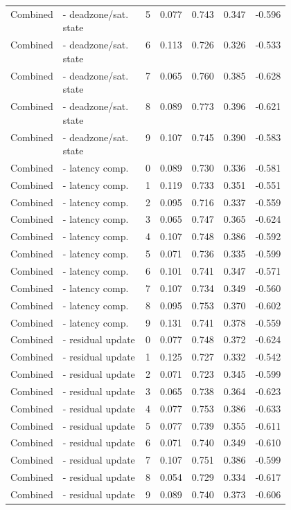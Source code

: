 \documentclass{article}
\begin{document}
\begin{center}
\begin{longtable}{p{0.13\linewidth}p{0.34\linewidth}rrrrr}
Combined & - deadzone/sat. state & 5 & 0.077 & 0.743 & 0.347 & -0.596\\
Combined & - deadzone/sat. state & 6 & 0.113 & 0.726 & 0.326 & -0.533\\
Combined & - deadzone/sat. state & 7 & 0.065 & 0.760 & 0.385 & -0.628\\
Combined & - deadzone/sat. state & 8 & 0.089 & 0.773 & 0.396 & -0.621\\
Combined & - deadzone/sat. state & 9 & 0.107 & 0.745 & 0.390 & -0.583\\
Combined & - latency comp. & 0 & 0.089 & 0.730 & 0.336 & -0.581\\
Combined & - latency comp. & 1 & 0.119 & 0.733 & 0.351 & -0.551\\
Combined & - latency comp. & 2 & 0.095 & 0.716 & 0.337 & -0.559\\
Combined & - latency comp. & 3 & 0.065 & 0.747 & 0.365 & -0.624\\
Combined & - latency comp. & 4 & 0.107 & 0.748 & 0.386 & -0.592\\
Combined & - latency comp. & 5 & 0.071 & 0.736 & 0.335 & -0.599\\
Combined & - latency comp. & 6 & 0.101 & 0.741 & 0.347 & -0.571\\
Combined & - latency comp. & 7 & 0.107 & 0.734 & 0.349 & -0.560\\
Combined & - latency comp. & 8 & 0.095 & 0.753 & 0.370 & -0.602\\
Combined & - latency comp. & 9 & 0.131 & 0.741 & 0.378 & -0.559\\
Combined & - residual update & 0 & 0.077 & 0.748 & 0.372 & -0.624\\
Combined & - residual update & 1 & 0.125 & 0.727 & 0.332 & -0.542\\
Combined & - residual update & 2 & 0.071 & 0.723 & 0.345 & -0.599\\
Combined & - residual update & 3 & 0.065 & 0.738 & 0.364 & -0.623\\
Combined & - residual update & 4 & 0.077 & 0.753 & 0.386 & -0.633\\
Combined & - residual update & 5 & 0.077 & 0.739 & 0.355 & -0.611\\
Combined & - residual update & 6 & 0.071 & 0.740 & 0.349 & -0.610\\
Combined & - residual update & 7 & 0.107 & 0.751 & 0.386 & -0.599\\
Combined & - residual update & 8 & 0.054 & 0.729 & 0.334 & -0.617\\
Combined & - residual update & 9 & 0.089 & 0.740 & 0.373 & -0.606\\

\end{longtable}
\end{center}
\end{document}
